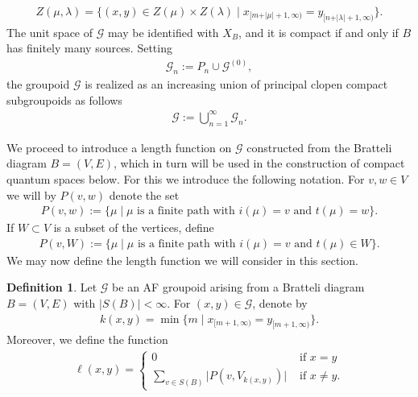 \documentclass[11pt,a4paper,oneside,final,reqno]{amsart}
\theoremstyle{definition}
\newtheorem{definition}[lemma]{Definition}
\newcommand{\G}{\mathcal{G}}
\newcommand{\Go}{\mathcal{G}^{(0)}}
\numberwithin{equation}{section}
\begin{document}
	\begin{align}\label{eq:def-cylinder-set}
		Z(\mu, \lambda) = \{ (x,y) \in Z(\mu) \times Z(\lambda) \mid x_{[m + \vert \mu \vert + 1, \infty)} = y_{[n + \vert \lambda \vert + 1 , \infty)} \}.
	\end{align}
	The unit space of $\G$ may be identified with $X_B$, and it is compact if and only if $B$ has finitely many sources. 
	Setting 
	\begin{align}\label{def:cpct-subgroupoids-Gn}
		\G_n := P_n \cup \Go ,
	\end{align}
	the groupoid $\G$  is  realized as an increasing union of principal  clopen compact subgroupoids as follows
	\begin{align*}
		\G := \bigcup_{n=1}^\infty \G_n .
	\end{align*} 

We proceed to introduce a length function on $\G$ constructed from the Bratteli diagram $B = (V,E)$, which in turn will be used in the construction of compact quantum spaces below. For this we introduce the following notation. 
For $v, w \in V$ we will by $P(v,w)$ denote the set
\begin{align*}
	P(v,w) := \{ \mu  \mid \mu \text{ is a finite path with } i(\mu) = v \text{ and } t(\mu) = w   \}.
\end{align*}
If $W \subset V$ is a subset of the vertices, define 
\begin{align*}
	P(v,W) := \{ \mu  \mid \mu \text{ is a finite path with } i(\mu) = v \text{ and } t(\mu) \in W   \}.
\end{align*}
We may now define the  length function we will consider in this section. 

	\begin{definition}\label{def:AF-length-function} 
	Let $\G$ be an AF groupoid arising from a Bratteli diagram $B = (V,E)$ with $\vert S(B)\vert < \infty$. 
	For $(x,y) \in \G$, denote by 
	\begin{align*}
		k(x,y) = \min \{m \mid x_{[m+1,\infty)} = y_{[m+1,\infty)}\}.
	\end{align*}
	 Moreover, we define the function
	\begin{align}\label{eq:def-AF-length-function}
		\ell(x,y) = \begin{cases}
			0 & \text{ if  $x=y$} \\ 
			\sum_{v \in S(B)} \vert P(v, V_{k(x,y)}) \vert & \text{ if $x \neq y$}.
		\end{cases}
	\end{align}
\end{definition}
	
\end{document}
